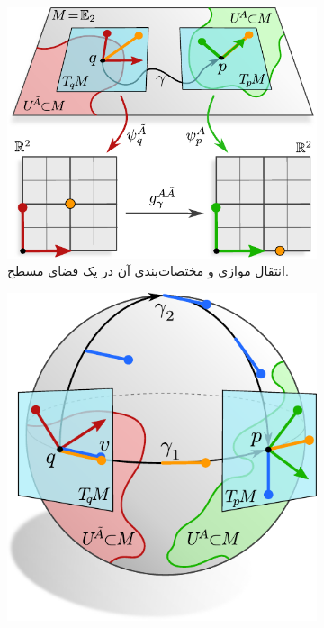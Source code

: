 \begin{figure}
	\centering
	\begin{subfigure}[b]{0.5\textwidth}
		\centering
		\includegraphics[width=.95\textwidth]{figures/transport_flat.pdf}
		\vspace*{1ex}
		\caption{\small
			انتقال موازی و مختصات‌بندی آن در یک فضای مسطح.
		}
		\label{fig:transport_flat}
	\end{subfigure}
	\hfill
	\begin{subfigure}[b]{0.4\textwidth}
		\centering
		\includegraphics[width=\textwidth]{figures/transport_sphere.pdf}

\end{subfigure}
\end{figure}
